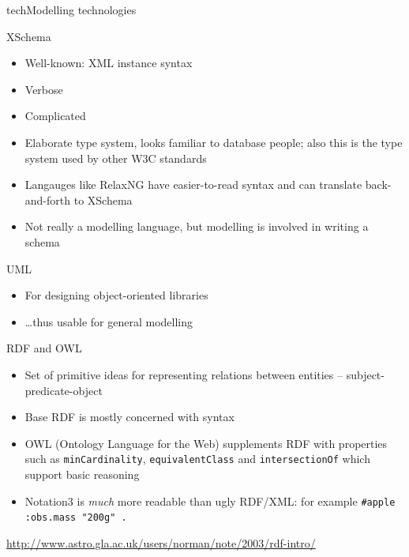 \documentclass[pdf,final,norman]{prosper}
\newenvironment{myslide}[1]{\begin{slide}{#1}\slidetoc{#1}}{\end{slide}}
\begin{document}
\begin{slidegroup}{tech}{Modelling technologies}


\begin{myslide}{XSchema}
\begin{itemize}
\item Well-known: XML instance syntax
\item Verbose
\item Complicated
\item Elaborate type system, looks familiar to database people; also this
is the type system used by other W3C standards
\item Langauges like RelaxNG have easier-to-read syntax and can
translate back-and-forth to XSchema
\item Not really a modelling language, but modelling is involved in
writing a schema
\end{itemize}
\end{myslide}

\begin{myslide}{UML}
\begin{itemize}
\item For designing object-oriented libraries
\item \dots thus usable for general modelling
\end{itemize}
\end{myslide}

\begin{myslide}{RDF and OWL}
\begin{itemize}
\item Set of primitive ideas for representing relations between
entities -- subject-predicate-object
\item Base RDF is mostly concerned with syntax
\item OWL (Ontology Language for the Web) supplements RDF with
properties such as \texttt{minCardinality}, \texttt{equivalentClass}
and \texttt{intersectionOf} which support basic reasoning
\item Notation3 is \emph{much} more readable than ugly RDF/XML: for example
\texttt{\#apple :obs.mass "200g" .}
\end{itemize}
\url{http://www.astro.gla.ac.uk/users/norman/note/2003/rdf-intro/}
\end{myslide}


\end{slidegroup}
\end{document}
